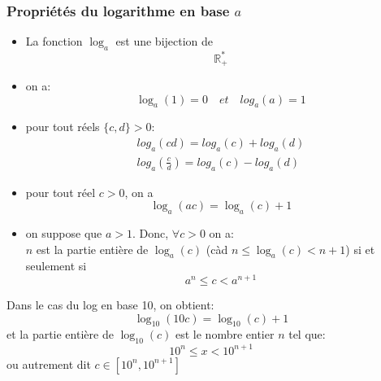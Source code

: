 	\subsubsection{Propri\'et\'es du logarithme en base $a$}
		\begin{itemize}
			\item La fonction $\log_a$ est une bijection de $$\mathbb{R}^*_+$$
			\item on a:
			\begin{equation*}
					\log_a(1)=0\quad et \quad log_a(a)=1	
    			\end{equation*}
			\item pour tout r\'eels $\{c, d\} >0$:
			\begin{align*}
    				log_a(cd)=log_a(c)+log_a(d) \\
				log_a(\frac{c}{d})=log_a(c)-log_a(d)
    			\end{align*}
			\item pour tout r\'eel $c>0$, on a
			\begin{equation*}
   				\log_a(ac)=\log_a(c)+1		
   			\end{equation*}
			\item on suppose que $a>1$. Donc, $\forall c>0$ on a: \\
				$n$ est la partie enti\`ere de $\log_a(c)$ (c\`ad $n \leq \log_a(c) < n+1$) si et seulement si
				\begin{equation*}
					a^n\leq c < a^{n+1}
   				 \end{equation*}	
		\end{itemize}
		\begin{example}
			Dans le cas du log en base 10, on obtient:
			\begin{equation*}
				\log_{10}(10c)=\log_10(c)+1
			\end{equation*}
			et la partie enti\`ere de $\log_10(c)$ est le nombre entier $n$ tel que:
			\begin{equation}
				10^n\leq x < 10^{n+1}
			\end{equation}
			ou autrement dit $c \in [10^n,10^{n+1}]$
		\end{example}

